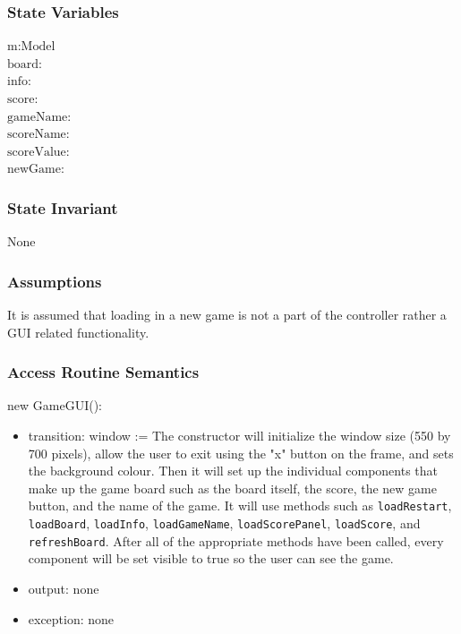\documentclass[12pt]{article}
\begin{document}
\subsubsection* {State Variables}

$\text{m}: \text{Model}$\\
$\text{board}$: \\
$\text{info}$: \\
$\text{score}$: \\
$\text{gameName}$: \\
$\text{scoreName}$: \\
$\text{scoreValue}$: \\
$\text{newGame}$: 

\subsubsection* {State Invariant}

None

\subsubsection* {Assumptions}

It is assumed that loading in a new game is not a part of the controller rather a GUI related functionality.

\subsubsection* {Access Routine Semantics}

\noindent new GameGUI():
\begin{itemize}
\item transition: window := The constructor will initialize the window size (550 by 700 pixels), allow the user to exit using the "x" button on the frame, and sets the background colour. Then it will set up the individual components that make up the game board such as the board itself, the score, the new game button, and the name of the game. It will use methods such as \verb|loadRestart|, \verb|loadBoard|, \verb|loadInfo|, \verb|loadGameName|, \verb|loadScorePanel|, \verb|loadScore|, and \verb|refreshBoard|. After all of the appropriate methods have been called, every component will be set visible to true so the user can see the game.
\item output: none
\item exception: none
\end{itemize}
\end{document}
